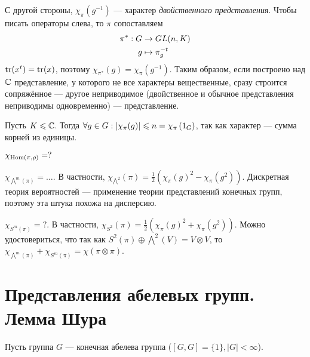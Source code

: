 {    С другой стороны, $\chi_{\pi}(g^{-1})$ --- характер \textit{двойственного представления}.
    Чтобы писать операторы слева, то $\pi$ сопоставляем
    \begin{align*}
        \pi^*: G &\rightarrow GL(n, K) \\ g & \mapsto \pi_g^{-t}
    \end{align*}
    $\operatorname{tr}(x^t) = \operatorname{tr}(x)$, поэтому $\chi_{\pi^*}(g) = \chi_\pi(g^{-1})$.
    Таким образом, если построено над $\mathbb{C}$ представление, у которого не все характеры вещественные, сразу строится сопряжённое --- другое неприводимое (двойственное и обычное представления неприводимы одновременно) --- представление.
    \item Пусть $K \leqslant \mathbb{C}$. Тогда $\forall g \in G: \left|\chi_\pi(g)\right| \leqslant n = \chi_\pi\left(1_G\right)$, так как характер --- сумма корней из единицы.
    \item $\chi_{\operatorname{Hom}(\pi,\rho)} = ?$
    \item $\chi_{\bigwedge^m(\pi)} = \dots$. В частности, $\chi_{\bigwedge^2}(\pi) = \frac12(\chi_\pi(g)^2 - \chi_{\pi}(g^2))$. Дискретная теория вероятностей --- применение теории представлений конечных групп, поэтому эта штука похожа на дисперсию.
    \item $\chi_{S^m(\pi)} = ?$. В частности, $\chi_{S^2}(\pi) = \frac12(\chi_\pi(g)^2 + \chi_{\pi}(g^2))$.
    Можно удостовериться, что так как $S^2(\pi) \oplus \bigwedge^2(V) = V \otimes V$, то $\chi_{\bigwedge^m(\pi)} + \chi_{S^m(\pi)} = \chi(\pi\otimes\pi)$.
}


\section{Представления абелевых групп. Лемма Шура}
Пусть группа $G$ --- конечная абелева группа ($[G, G] = \{1\}, |G| < \infty$).


